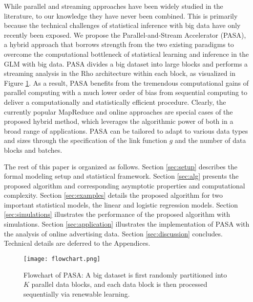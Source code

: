 \documentclass[12pt]{article}
\begin{document}
While parallel and streaming approaches have been widely studied in the literature, to our knowledge they have never been combined. This is primarily because the technical challenges of statistical inference with big data have only recently been exposed. We propose the Parallel-and-Stream Accelerator (PASA), a hybrid approach that borrows strength from the two existing paradigms to overcome the computational bottleneck of statistical learning and inference in the GLM with big data. PASA divides a big dataset into large blocks and performs a streaming analysis in the Rho architecture within each block, as visualized in Figure \ref{fig-dataflow}. As a result, PASA benefits from the tremendous computational gains of parallel computing with a much lower order of bias from sequential computing to deliver a computationally and statistically efficient procedure. Clearly, the currently popular MapReduce and online approaches are special cases of the proposed hybrid method, which leverages the algorithmic power of both in a broad range of applications. PASA can be tailored to adapt to various data types and sizes through the specification of the link function $g$ and the number of data blocks and batches. 

The rest of this paper is organized as follows. Section \ref{sec:setup} describes the formal modeling setup and statistical framework. Section \ref{sec:alg} presents the proposed algorithm and corresponding asymptotic properties and computational complexity. Section \ref{sec:examples} details the proposed algorithm for two important statistical models, the linear and logistic regression models. Section \ref{sec:simulations} illustrates the performance of the proposed algorithm with simulations. Section \ref{sec:application} illustrates the implementation of PASA with the analysis of online advertising data. Section \ref{sec:discussion} concludes. Technical details are deferred to the Appendices.

\begin{figure}[ht]
\centering
\texttt{[image: flowchart.png]}
\caption{Flowchart of PASA: A big dataset is first randomly partitioned into $K$ parallel data blocks, and each data block is then processed sequentially via renewable learning. \label{fig-dataflow}}
\end{figure}

\vspace{-2em}
\end{document}
